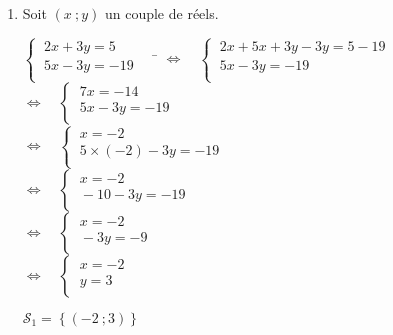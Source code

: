 \documentclass[a4paper,11pt,exos]{nsi} %
\begin{document}
\begin{enumerate}
    \item Soit $(x\ ;y)$ un couple de réels.
    \begin{tabbing}
        $\left\{
            \begin{array}{l}
                \ 2x+3y=5 \\
				\ 5x-3y=-19\\
            \end{array} \right. \quad$  \= $\iff\quad 
            \left\{
                \begin{array}{l}
                \ 2x+5x+3y-3y=5-19 \\
                \ 5x-3y=-19\\
            \end{array} \right.$\\[.5em]

            \>  $\iff\quad \left\{
                \begin{array}{l}
                \ 7x=-14 \\
                \ 5x-3y=-19\\
            \end{array} \right.$\\[.5em]

            \>  $\iff\quad \left\{
                \begin{array}{l}
                \ x=-2 \\
                \ 5\times(-2)-3y=-19\\
            \end{array} \right.$\\[.5em]

            \>  $\iff\quad \left\{
                \begin{array}{l}
                \ x=-2 \\
                \ -10-3y=-19\\
            \end{array} \right.$\\[.5em]

            \>  $\iff\quad \left\{
                \begin{array}{l}
                \ x=-2 \\
                \ -3y=-9\\
            \end{array} \right.$\\[.5em]

            \>  $\iff\quad \left\{
                \begin{array}{l}
                \ x=-2 \\
                \ y=3\\
            \end{array} \right.$
        \end{tabbing}
        $\mathcal{S}_1=\left\{\left(-2\ ;3\right)\right\}$
        

\end{enumerate}
\end{document}
